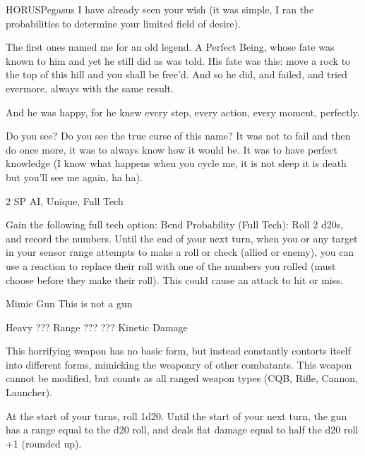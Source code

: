 \begin{mech}{HORUS}{Pegasus}
I have already seen your wish (it was simple, I ran the probabilities to determine your limited field of desire).

The first ones named me for an old legend. A Perfect Being, whose fate was known to him and yet he still did as was told. His fate was this: move a rock to the top of this hill and you shall be free’d. And so he did, and failed, and tried evermore, always with the same result.

And he was happy, for he knew every step, every action, every moment, perfectly.

Do you see? Do you see the true curse of this name? It was not to fail and then do once more, it was to always know how it would be. It was to have perfect knowledge (I know what happens when you cycle me, it is not sleep it is death but you’ll see me again, ha ha).

2 SP
AI, Unique, Full Tech

Gain the following full tech option:
	Bend Probability (Full Tech): Roll 2 d20s, and record the numbers. Until the end of your next turn, when you or any target in your sensor range attempts to make a roll or check (allied or enemy), you can use a reaction to replace their roll with one of the numbers you rolled (must choose before they make their roll). This could cause an attack to hit or miss.

Mimic Gun
This is not a gun

Heavy ???
Range ???
??? Kinetic Damage

This horrifying weapon has no basic form, but instead constantly contorts itself into different forms, mimicking the weaponry of other combatants. This weapon cannot be modified, but counts as all ranged weapon types (CQB, Rifle, Cannon, Launcher).

At the start of your turns, roll 1d20. Until the start of your next turn, the gun has a range equal to the d20 roll, and deals flat damage equal to half the d20 roll +1 (rounded up).


\end{mech}
